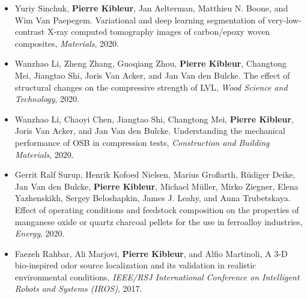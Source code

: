 \documentclass[oneside, english, 10pt, a4paper]{memoir}
\begin{document}
\begin{itemize}
			\item {Yuriy Sinchuk, \textbf{Pierre Kibleur}, Jan Aelterman, Matthieu N. Boone, and Wim Van Paepegem}. {Variational and deep learning segmentation of very-low-contrast X-ray computed tomography images of carbon/epoxy woven composites}, \emph{Materials}, 2020.   
			
			\item {Wanzhao Li, Zheng Zhang, Guoqiang Zhou, \textbf{Pierre Kibleur}, Changtong Mei, Jiangtao Shi, Joris Van Acker, and Jan Van den Bulcke}. {The effect of structural changes on the compressive strength of LVL}, \emph{Wood Science and Technology}, 2020.     
		
			\item  {Wanzhao Li, Chaoyi Chen, Jiangtao Shi, Changtong Mei, \textbf{Pierre Kibleur}, Joris Van Acker, and Jan Van den Bulcke}. {Understanding the mechanical performance of OSB in compression tests}, \emph{Construction and Building Materials}, 2020.
			
			\item {Gerrit Ralf Surup, Henrik Kofoed Nielsen, Marius Gro{\ss}arth, R{\"{u}}diger Deike, Jan Van den Bulcke, \textbf{Pierre Kibleur}, Michael M{\"{u}}ller, Mirko Ziegner, Elena Yazhenskikh, Sergey Beloshapkin, James J. Leahy, and Anna Trubetskaya}. {Effect of operating conditions and feedstock composition on the properties of manganese oxide or quartz charcoal pellets for the use in ferroalloy industries}, \emph{Energy}, 2020.
			
			\item {Faezeh Rahbar, Ali Marjovi, \textbf{Pierre Kibleur}, and Alfio Martinoli, A 3-D bio-inspired odor source localization and its validation in realistic environmental conditions, \emph{IEEE/RSJ International Conference on Intelligent Robots and Systems (IROS)}, 2017.}
		\end{itemize}
		       
\end{document}
